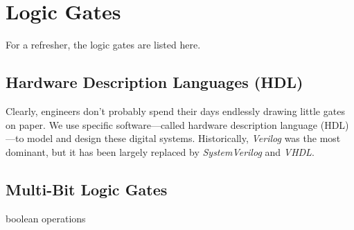 \section{Logic Gates}

  For a refresher, the logic gates are listed here. 

\subsection{Hardware Description Languages (HDL)}

  Clearly, engineers don't probably spend their days endlessly drawing little gates on paper. We use specific software---called hardware description language (HDL)---to model and design these digital systems. Historically, \textit{Verilog} was the most dominant, but it has been largely replaced by \textit{SystemVerilog} and \textit{VHDL}. 

\subsection{Multi-Bit Logic Gates}

  \begin{definition}
    
  \end{definition}

  \begin{definition}
    
  \end{definition}

  \begin{definition}
    
  \end{definition}

  \begin{definition}
    
  \end{definition}

  \begin{definition}
    
  \end{definition}

  \begin{definition}
    
  \end{definition}

  \begin{definition}
    
  \end{definition}


  boolean operations

